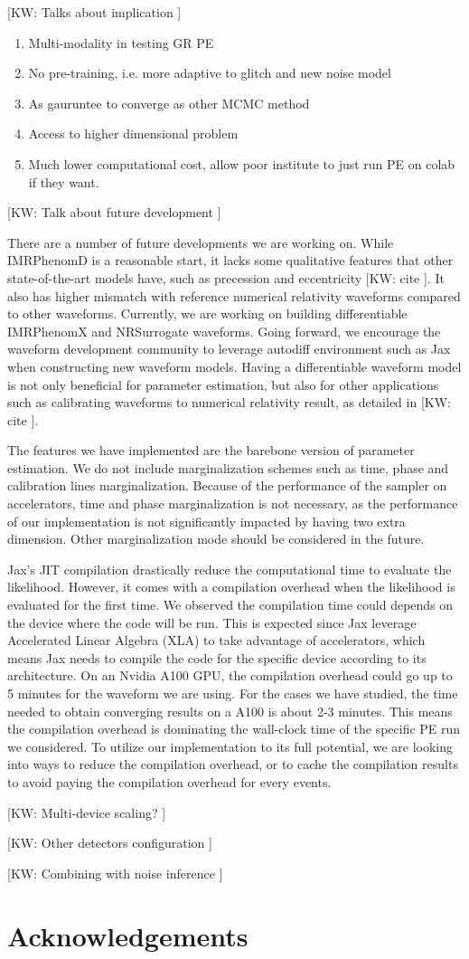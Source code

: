\documentclass[twocolumn]{aastex631}
\newcommand{\kw}[1]{{\color{rb4}[KW: #1 ]}}
\begin{document}
\kw{Talks about implication}
\begin{enumerate}
    \item Multi-modality in testing GR PE
    \item No pre-training, i.e. more adaptive to glitch and new noise model
    \item As gauruntee to converge as other MCMC method
    \item Access to higher dimensional problem
    \item Much lower computational cost, allow poor institute to just run PE on colab if they want.
\end{enumerate}

\kw{Talk about future development}

There are a number of future developments we are working on.
While IMRPhenomD is a reasonable start, it lacks some qualitative features that other state-of-the-art models have,
such as precession and eccentricity \kw{cite}.
It also has higher mismatch with reference numerical relativity waveforms compared to other waveforms.
Currently, we are working on building differentiable IMRPhenomX and NRSurrogate waveforms.
Going forward, we encourage the waveform development community to leverage autodiff environment such as Jax when constructing new waveform models.
Having a differentiable waveform model is not only beneficial for parameter estimation, but also for other applications such as calibrating waveforms to numerical relativity result, as detailed in \kw{cite}.

The features we have implemented are the barebone version of parameter estimation.
We do not include marginalization schemes such as time, phase and calibration lines marginalization.
Because of the performance of the sampler on accelerators, time and phase marginalization is not necessary,
as the performance of our implementation is not significantly impacted by having two extra dimension.
Other marginalization mode should be considered in the future.

Jax's JIT compilation drastically reduce the computational time to evaluate the likelihood.
However, it comes with a compilation overhead when the likelihood is evaluated for the first time.
We observed the compilation time could depends on the device where the code will be run.
This is expected since Jax leverage Accelerated Linear Algebra (XLA) to take advantage of accelerators,
which means Jax needs to compile the code for the specific device according to its architecture.
On an Nvidia A100 GPU, the compilation overhead could go up to 5 minutes for the waveform we are using.
For the cases we have studied, the time needed to obtain converging results on a A100 is about 2-3 minutes.
This means the compilation overhead is dominating the wall-clock time of the specific PE run we considered.
To utilize our implementation to its full potential, we are looking into ways to reduce the compilation overhead,
or to cache the compilation results to avoid paying the compilation overhead for every events.

\kw{Multi-device scaling?}

\kw{Other detectors configuration}

\kw{Combining with noise inference}

\section{Acknowledgements}


\end{document}
